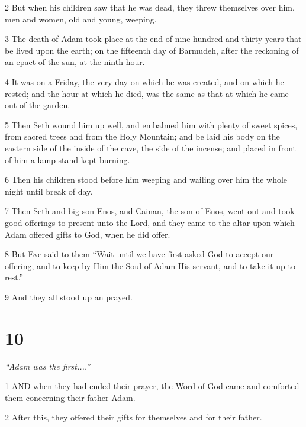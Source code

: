 \par 2 But when his children saw that he was dead, they threw themselves over him, men and women, old and young, weeping.

\par 3 The death of Adam took place at the end of nine hundred and thirty years that be lived upon the earth; on the fifteenth day of Barmudeh, after the reckoning of an epact of the sun, at the ninth hour.

\par 4 It was on a Friday, the very day on which be was created, and on which he rested; and the hour at which he died, was the same as that at which he came out of the garden.

\par 5 Then Seth wound him up well, and embalmed him with plenty of sweet spices, from sacred trees and from the Holy Mountain; and be laid his body on the eastern side of the inside of the cave, the side of the incense; and placed in front of him a lamp-stand kept burning.

\par 6 Then his children stood before him weeping and wailing over him the whole night until break of day.

\par 7 Then Seth and big son Enos, and Cainan, the son of Enos, went out and took good offerings to present unto the Lord, and they came to the altar upon which Adam offered gifts to God, when he did offer.

\par 8 But Eve said to them “Wait until we have first asked God to accept our offering, and to keep by Him the Soul of Adam His servant, and to take it up to rest.”

\par 9 And they all stood up an prayed.

\chapter{10}

\par \textit{“Adam was the first....”}

\par 1 AND when they had ended their prayer, the Word of God came and comforted them concerning their father Adam.

\par 2 After this, they offered their gifts for themselves and for their father.

